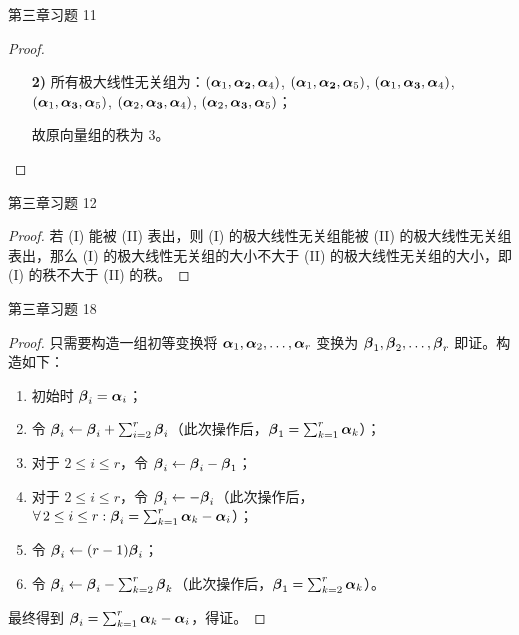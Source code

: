 \begin{problem}
	第三章习题 11

	\begin{proof}
		\begin{enumerate}
			\item[\textbf{2)}] 所有极大线性无关组为：$(\boldsymbol{\alpha}_1, \boldsymbol{\alpha_2}, \boldsymbol{\alpha}_4)$, $(\boldsymbol{\alpha}_1, \boldsymbol{\alpha_2}, \boldsymbol{\alpha}_5)$, $(\boldsymbol{\alpha}_1, \boldsymbol{\alpha_3}, \boldsymbol{\alpha}_4)$, $(\boldsymbol{\alpha}_1, \boldsymbol{\alpha_3}, \boldsymbol{\alpha}_5)$, $(\boldsymbol{\alpha}_2, \boldsymbol{\alpha_3}, \boldsymbol{\alpha}_4)$, $(\boldsymbol{\alpha}_2, \boldsymbol{\alpha_3}, \boldsymbol{\alpha}_5)$；
			
			故原向量组的秩为 $3$。
		\end{enumerate}
	\end{proof}
\end{problem}

\begin{problem}
	第三章习题 12

	\begin{proof}
		若 (I) 能被 (II) 表出，则 (I) 的极大线性无关组能被 (II) 的极大线性无关组表出，那么 (I) 的极大线性无关组的大小不大于 (II) 的极大线性无关组的大小，即 (I) 的秩不大于 (II) 的秩。
	\end{proof}
\end{problem}

\begin{problem}
	第三章习题 18

	\begin{proof}
		只需要构造一组初等变换将 $\boldsymbol{\alpha}_1, \boldsymbol{\alpha}_2, \dots, \boldsymbol{\alpha}_r$ 变换为 $\boldsymbol{\beta}_1, \boldsymbol{\beta}_2, \dots, \boldsymbol{\beta}_r$ 即证。构造如下：

		\begin{enumerate}
			\item 初始时 $\boldsymbol{\beta}_i = \boldsymbol{\alpha}_i$；
			\item 令 $\boldsymbol{\beta}_i \gets \boldsymbol{\beta}_i + \sum_{i=2}^r \boldsymbol{\beta}_i$（此次操作后，$\boldsymbol{\beta}_1 = \sum_{k=1}^r \boldsymbol{\alpha}_k$）；
			\item 对于 $2 \le i \le r$，令 $\boldsymbol{\beta}_i \gets \boldsymbol{\beta}_i - \boldsymbol{\beta}_1$；
			\item 对于 $2 \le i \le r$，令 $\boldsymbol{\beta}_i \gets -\boldsymbol{\beta}_i$（此次操作后，$\forall\,2 \le i \le r: \boldsymbol{\beta}_i = \sum_{k=1}^r \boldsymbol{\alpha}_k - \boldsymbol{\alpha}_i$）；
			\item 令 $\boldsymbol{\beta}_i \gets (r - 1) \boldsymbol{\beta}_i$；
			\item 令 $\boldsymbol{\beta}_i \gets \boldsymbol{\beta}_i - \sum_{k=2}^r \boldsymbol{\beta}_k$（此次操作后，$\boldsymbol{\beta}_1 = \sum_{k=2}^r \boldsymbol{\alpha}_k$）。
		\end{enumerate}

		最终得到 $\boldsymbol{\beta}_i = \sum_{k=1}^r \boldsymbol{\alpha}_k - \boldsymbol{\alpha}_i$，得证。
	\end{proof}
\end{problem}

